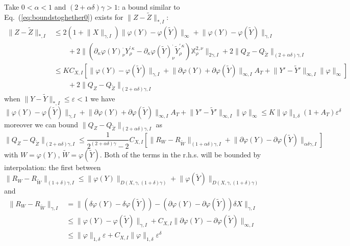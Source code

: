 \documentclass[a4paper,12pt,reqno]{amsproc}
\newcommand{\der}{\delta\!}
\newcommand{\XX}{\mathbb{X}}
\newcommand{\norm}[1]{\lVert #1\rVert}
\newcommand{\wt}{\widetilde}
\begin{document}
Take $0 < \alpha < 1$ and $(2+\alpha \delta)\gamma > 1$:
a bound similar to Eq.~(\ref{eq:boundstoghether0}) exists for
$\norm{Z-\wt Z}_{*,I}$:
\begin{equation*}
  \begin{split}
\norm{Z-\wt Z}_{*,I} & 
 \le
2 (1+\norm{X}_{\gamma,I}) \norm{\varphi(Y)-\varphi(\wt Y)}_\infty +
\norm{\varphi(Y)-\varphi(\wt Y)}_{\gamma,I} 
\\ & \qquad 
 + 2 \norm{(\partial_\kappa \varphi(Y)^{\cdot}_{\nu}
 Y^{\prime\,\kappa}_{\rho}-\partial_\kappa \varphi(\wt Y)^{\cdot}_{\nu}
 \wt Y^{\prime\,\kappa}_{\rho}) \XX^{2,\nu}_{\rho}}_{2\gamma,I} +
 2 \norm{Q_Z-Q_{\wt Z}}_{(2+\alpha \delta)\gamma,I}
\\ & \le K C_{X,I}\left[
\norm{\varphi(Y)-\varphi(\wt Y)}_{\gamma,I} 
+\norm{\partial \varphi(Y) + \partial \varphi(\wt Y)}_{\infty,I} A_{T} +
 \norm{Y'-\wt Y'}_{\infty,I} \norm{\varphi}_{\infty}
\right]
\\ & \qquad +
 2 \norm{Q_Z-Q_{\wt Z}}_{(2+\alpha \delta)\gamma,I}
  \end{split}
\end{equation*}
when $\norm{Y-\wt Y}_{*,I} \le \varepsilon < 1$ we have
$$
\norm{\varphi(Y)-\varphi(\wt Y)}_{\gamma,I} 
+\norm{\partial \varphi(Y) + \partial \varphi(\wt Y)}_{\infty,I} A_{T} +
 \norm{Y'-\wt Y'}_{\infty,I} \norm{\varphi}_{\infty} \le K
 \norm{\varphi}_{1,\delta} (1+A_T) \varepsilon^\delta 
$$
moreover we can bound $\norm{Q_Z-Q_{\wt Z}}_{(2+\alpha
  \delta)\gamma,I}$ as
$$
\norm{Q_Z-Q_{\wt Z}}_{(2+\alpha
  \delta)\gamma,I} \le \frac{1}{2^{(2+\alpha\delta)\gamma}-2}
C_{X,I} \left[\norm{R_{W}-R_{\wt W}}_{(1+\alpha\delta)\gamma,I} + \norm{\partial
    \varphi(Y) - \partial \varphi(\wt Y)}_{\alpha\delta\gamma,I} \right]
$$
with $W = \varphi(Y)$, $\wt W = \varphi(\wt Y)$.
Both of the terms in the r.h.s. will be bounded by interpolation: the
first between
$$
\norm{R_{W}-R_{\wt W}}_{(1+
  \delta)\gamma,I} \le
\norm{\varphi(Y)}_{D(X,\gamma,(1+\delta)\gamma)}
+ \norm{\varphi(\wt Y)}_{D(X,\gamma,(1+\delta)\gamma)}
$$
and
\begin{equation*}
  \begin{split}
\norm{R_{W}-R_{\wt W}}_{\gamma,I} & = 
\norm{(\der \varphi(Y)-\der \varphi(\wt Y)) - (\partial \varphi(Y) -
  \partial \varphi(\wt Y)) \der X}_{\gamma,I}
\\ &\le \norm{\varphi(Y)- \varphi(\wt Y)}_{\gamma,I} + C_{X,I}
\norm{\partial \varphi(Y) - \partial \varphi(\wt Y)}_{\infty,I}    
\\ & \le \norm{\varphi}_{1,\delta} \varepsilon 
+ C_{X,I} \norm{\varphi}_{1,\delta} \varepsilon^\delta
  \end{split}
\end{equation*}
\end{document}
